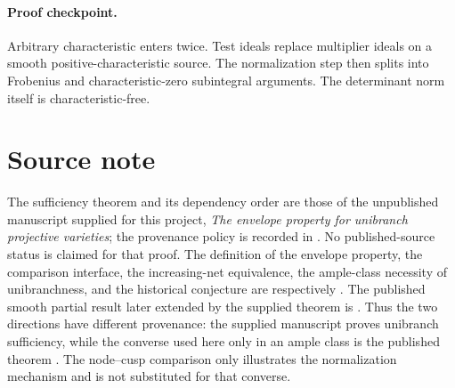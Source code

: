 \paragraph{Proof checkpoint.}
Arbitrary characteristic enters twice.  Test ideals replace multiplier
ideals on a smooth positive-characteristic source.  The normalization step
then splits into Frobenius and characteristic-zero subintegral arguments.
The determinant norm itself is characteristic-free.

\section{Source note}

The sufficiency theorem and its dependency order are those of the
unpublished manuscript supplied for this project, \emph{The envelope
property for unibranch projective varieties}; the provenance policy is
recorded in .  No published-source status is claimed
for that proof.  The definition of the envelope property, the
comparison interface, the increasing-net equivalence, the ample-class
necessity of unibranchness, and the historical conjecture are respectively
\cite[Definition~5.8, Theorem~4.22, Theorem~5.11, Theorem~5.12, and
Conjecture~5.14]{BJ22}.  The published smooth partial result later extended
by the supplied theorem is \cite[Theorem~A]{BJ22b}.  Thus the two directions have
different provenance: the supplied manuscript proves unibranch
sufficiency, while the converse used here only in an ample class is the
published theorem \cite[Theorem~5.12]{BJ22}.  The node--cusp comparison
only illustrates the normalization mechanism and is not substituted for
that converse.
